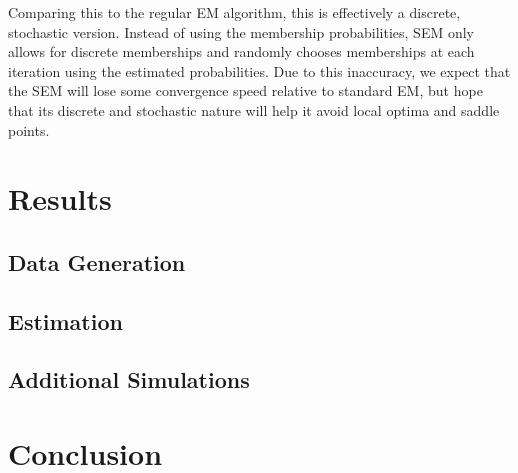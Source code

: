 \documentclass{article}
\theoremstyle{definition}
\theoremstyle{algodesc}
\begin{document}
Comparing this to the regular EM algorithm, this is effectively a discrete, stochastic version. Instead of using the membership probabilities, SEM only allows for discrete memberships and randomly chooses memberships at each iteration using the estimated probabilities. Due to this inaccuracy, we expect that the SEM will lose some convergence speed relative to standard EM, but hope that its discrete and stochastic nature will help it avoid local optima and saddle points.



\section{Results}

\subsection{Data Generation}
\subsection{Estimation}
\subsection{Additional Simulations}

\section{Conclusion}





\end{document}
